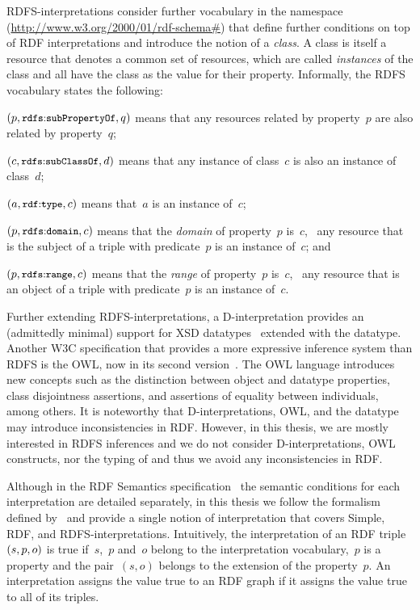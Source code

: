 \ac{RDFS}-interpretations consider further vocabulary in the  namespace
(\url{http://www.w3.org/2000/01/rdf-schema#}) that define further conditions on top of \ac{RDF} interpretations and
introduce the notion of a \emph{class}.  A class is itself a resource that denotes a common set of resources, which are
called \emph{instances} of the class and all have the class as the value for their  property.
%
Informally, the \ac{RDFS} vocabulary states the following:
%
\begin{inparaenum}[(i)]
\item $(p, \mbox{\small$\mathtt{rdfs{:}subPropertyOf}$}, q)$ means that any resources related by property~$p$ are also related by
  property~$q$;
\item $(c, \mbox{\small$\mathtt{rdfs{:}subClassOf}$}, d)$ means that any instance of class~$c$ is also an instance of class~$d$;
\item $(a, \mbox{\small$\mathtt{rdf{:}type}$}, c)$ means that~$a$ is an instance of~$c$;
\item $(p, \mbox{\small$\mathtt{rdfs{:}domain}$}, c)$ means that the \emph{domain} of property~$p$ is~$c$, \ie~any resource that
  is the subject of a triple with predicate~$p$ is an instance of~$c$; and
\item $(p, \mbox{\small$\mathtt{rdfs{:}range}$}, c)$ means that the \emph{range} of property~$p$ is~$c$, \ie~any resource that is
  an object of a triple with predicate~$p$ is an instance of~$c$.
\end{inparaenum}
%

Further extending \ac{RDFS}-interpretations, a D-interpretation provides an (admittedly minimal) support for \ac{XSD}
datatypes~\cite{BironMalhotra:2004aa} extended with the  datatype.
%
Another \ac{W3C} specification that provides a more expressive inference system than \ac{RDFS} is the \ac{OWL}, now in
its second version~\cite{HitzlerKrotzschParsia:2009aa}.  The \ac{OWL} language introduces new concepts such as the
distinction between object and datatype properties, class disjointness assertions, and assertions of equality between
individuals, among others.
%
It is noteworthy that D-interpretations, \ac{OWL}, and the  datatype may introduce
inconsistencies in \ac{RDF}.
%
However, in this thesis, we are mostly interested in \ac{RDFS} inferences and we do not consider D-interpretations,
\ac{OWL} constructs, nor the typing of  and thus we avoid any inconsistencies in \ac{RDF}.  
%


Although in the \ac{RDF} Semantics specification~\cite{Hayes:2004aa} the semantic conditions for each interpretation are
detailed separately, in this thesis we follow the formalism defined
by~\citet{MunozPerezGutierrez:2007aa,MunozPerezGutierrez:2009aa} and provide a single notion of interpretation that
covers Simple, \ac{RDF}, and \ac{RDFS}-interpretations. 
%
Intuitively, the interpretation of an \ac{RDF} triple~$(s,p,o)$ is true if~$s$,~$p$ and~$o$ belong to the
interpretation vocabulary,~$p$ is a property and the pair~$(s,o)$ belongs to the extension of the property~$p$.  An
interpretation assigns the value true to an \ac{RDF} graph if it assigns the value true to all of its triples.
%


